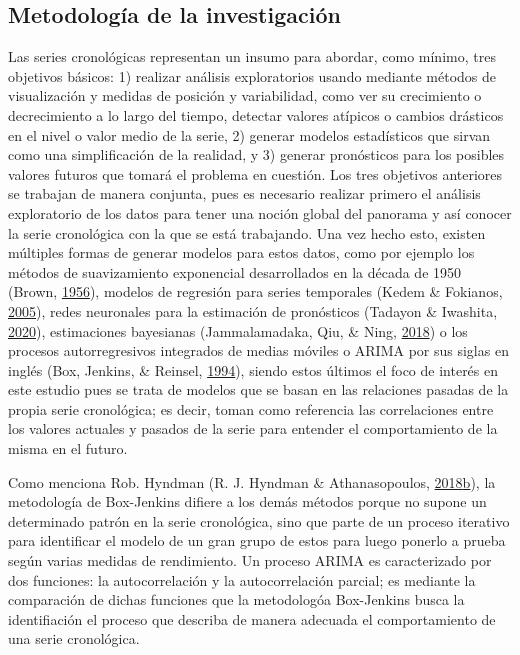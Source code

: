 \documentclass[
]{article}
\begin{document}
\subsection{Metodología de la investigación}

Las series cronológicas representan un insumo para abordar, como mínimo,
tres objetivos básicos: 1) realizar análisis exploratorios usando
mediante métodos de visualización y medidas de posición y variabilidad,
como ver su crecimiento o decrecimiento a lo largo del tiempo, detectar
valores atípicos o cambios drásticos en el nivel o valor medio de la
serie, 2) generar modelos estadísticos que sirvan como una
simplificación de la realidad, y 3) generar pronósticos para los
posibles valores futuros que tomará el problema en cuestión. Los tres
objetivos anteriores se trabajan de manera conjunta, pues es necesario
realizar primero el análisis exploratorio de los datos para tener una
noción global del panorama y así conocer la serie cronológica con la que
se está trabajando. Una vez hecho esto, existen múltiples formas de
generar modelos para estos datos, como por ejemplo los métodos de
suavizamiento exponencial desarrollados en la década de 1950 (Brown,
\protect\hyperlink{ref-brown}{1956}), modelos de regresión para series
temporales (Kedem \& Fokianos, \protect\hyperlink{ref-kedem}{2005}),
redes neuronales para la estimación de pronósticos (Tadayon \& Iwashita,
\protect\hyperlink{ref-redes}{2020}), estimaciones bayesianas
(Jammalamadaka, Qiu, \& Ning, \protect\hyperlink{ref-bayes}{2018}) o los
procesos autorregresivos integrados de medias móviles o ARIMA por sus
siglas en inglés (Box, Jenkins, \& Reinsel,
\protect\hyperlink{ref-box-jenkins}{1994}), siendo estos últimos el foco
de interés en este estudio pues se trata de modelos que se basan en las
relaciones pasadas de la propia serie cronológica; es decir, toman como
referencia las correlaciones entre los valores actuales y pasados de la
serie para entender el comportamiento de la misma en el futuro.

Como menciona Rob. Hyndman (R. J. Hyndman \& Athanasopoulos,
\protect\hyperlink{ref-hyndman_box-jenkins}{2018}\protect\hyperlink{ref-hyndman_box-jenkins}{b}),
la metodología de Box-Jenkins difiere a los demás métodos porque no
supone un determinado patrón en la serie cronológica, sino que parte de
un proceso iterativo para identificar el modelo de un gran grupo de
estos para luego ponerlo a prueba según varias medidas de rendimiento.
Un proceso ARIMA es caracterizado por dos funciones: la autocorrelación
y la autocorrelación parcial; es mediante la comparación de dichas
funciones que la metodologóa Box-Jenkins busca la identifiación el
proceso que describa de manera adecuada el comportamiento de una serie
cronológica.
\end{document}
